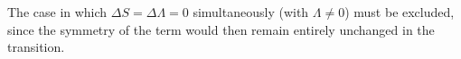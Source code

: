 The case in which $\Delta S=\Delta\Lambda=0$ simultaneously (with $\Lambda\ne0$) must be excluded, since the symmetry of the term would then remain entirely unchanged in the transition.
